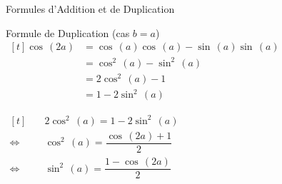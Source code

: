 \documentclass{coursbook}
\begin{document}
\begin{Gpartie}{Formules d'Addition et de Duplication}
\begin{Spartie}{Formule de Duplication (cas $b=a$)}
            $\begin{aligned}[t]
                \cos\,(2a) &= \cos\,(a)\cos\,(a)-\sin\,(a)\sin\,(a) \\
                &=\cos^2\,(a)-\sin^2\,(a) \\
                &= 2\cos^2\,(a)-1 \\ 
                &= 1-2\sin^2\,(a)
            \end{aligned}$

            $\begin{aligned}[t]
                &\quad2\cos^2\,(a)=1-2\sin^2\,(a) \\
                \iff&\quad\cos^2\,(a)=\dfrac{\cos\,(2a)+1}{2} \\
                \iff&\quad\sin^2\,(a)=\dfrac{1-\cos\,(2a)}{2}
            \end{aligned}$
        \end{Spartie}
    \end{Gpartie}
    \pagebreak
\end{document}
